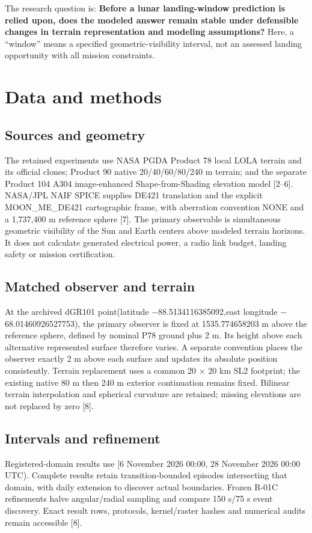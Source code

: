 \documentclass[conference,letterpaper]{IEEEtran}
\begin{document}
The research question is: \textbf{Before a lunar landing-window prediction is relied upon, does the modeled answer remain stable under defensible changes in terrain representation and modeling assumptions?} Here, a ``window'' means a specified geometric-visibility interval, not an assessed landing opportunity with all mission constraints.

\section{Data and methods}

\subsection{Sources and geometry}
The retained experiments use NASA PGDA Product 78 local LOLA terrain and its official clones; Product 90 native 20/40/60/80/240 m terrain; and the separate Product 104 A304 image-enhanced Shape-from-Shading elevation model [2--6]. NASA/JPL NAIF SPICE supplies DE421 translation and the explicit MOON\_ME\_DE421 cartographic frame, with aberration convention NONE and a 1,737,400 m reference sphere [7]. The primary observable is simultaneous geometric visibility of the Sun and Earth centers above modeled terrain horizons. It does not calculate generated electrical power, a radio link budget, landing safety or mission certification.

\subsection{Matched observer and terrain}
At the archived dGR101 point\newline (latitude $-$88.5134116385092\textdegree{},\newline east longitude $-$68.01460926527753\textdegree{}), the primary observer is fixed at 1535.774658203 m above the reference sphere, defined by nominal P78 ground plus 2 m. Its height above each alternative represented surface therefore varies. A separate convention places the observer exactly 2 m above each surface and updates its absolute position consistently. Terrain replacement uses a common 20 $\times$ 20 km SL2 footprint; the existing native 80 m then 240 m exterior continuation remains fixed. Bilinear terrain interpolation and spherical curvature are retained; missing elevations are not replaced by zero [8].

\subsection{Intervals and refinement}
Registered-domain results use [6 November 2026 00:00, 28 November 2026 00:00 UTC). Complete results retain transition-bounded episodes intersecting that domain, with daily extension to discover actual boundaries. Frozen R-01C refinements halve angular/radial sampling and compare 150 s/75 s event discovery. Exact result rows, protocols, kernel/raster hashes and numerical audits remain accessible [8].
\end{document}
